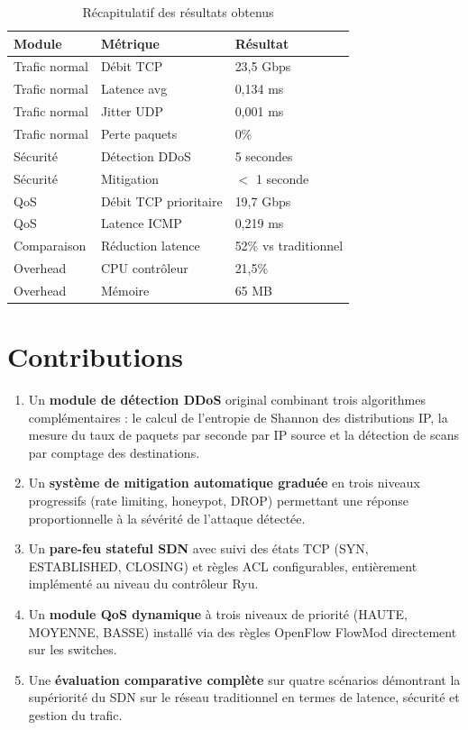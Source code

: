\documentclass[12pt,a4paper]{report}
\begin{document}
\begin{table}[H]
\centering
\caption{Récapitulatif des résultats obtenus}
\label{tab:resultats}
\begin{tabular}{lll}
\toprule
\textbf{Module} & \textbf{Métrique} & \textbf{Résultat} \\
\midrule
Trafic normal & Débit TCP & 23,5 Gbps \\
Trafic normal & Latence avg & 0,134 ms \\
Trafic normal & Jitter UDP & 0,001 ms \\
Trafic normal & Perte paquets & 0\% \\
Sécurité & Détection DDoS & 5 secondes \\
Sécurité & Mitigation & $<$ 1 seconde \\
QoS & Débit TCP prioritaire & 19,7 Gbps \\
QoS & Latence ICMP & 0,219 ms \\
Comparaison & Réduction latence & 52\% vs traditionnel \\
Overhead & CPU contrôleur & 21,5\% \\
Overhead & Mémoire & 65 MB \\
\bottomrule
\end{tabular}
\end{table}

\section{Contributions}

\begin{enumerate}
    \item Un \textbf{module de détection DDoS} original
    combinant trois algorithmes complémentaires : le calcul
    de l'entropie de Shannon des distributions IP, la
    mesure du taux de paquets par seconde par IP source
    et la détection de scans par comptage des destinations.
    \item Un \textbf{système de mitigation automatique
    graduée} en trois niveaux progressifs (rate limiting,
    honeypot, DROP) permettant une réponse proportionnelle
    à la sévérité de l'attaque détectée.
    \item Un \textbf{pare-feu stateful SDN} avec suivi
    des états TCP (SYN, ESTABLISHED, CLOSING) et règles
    ACL configurables, entièrement implémenté au niveau
    du contrôleur Ryu.
    \item Un \textbf{module QoS dynamique} à trois niveaux
    de priorité (HAUTE, MOYENNE, BASSE) installé via des
    règles OpenFlow FlowMod directement sur les switches.
    \item Une \textbf{évaluation comparative complète}
    sur quatre scénarios démontrant la supériorité du
    SDN sur le réseau traditionnel en termes de latence,
    sécurité et gestion du trafic.
\end{enumerate}
\end{document}
